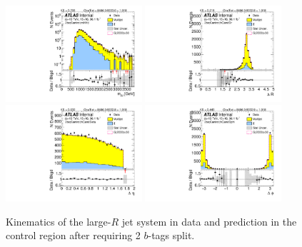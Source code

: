 \begin{figure}[htbp!]
\begin{center}
\includegraphics[width=0.45\textwidth,angle=-90]{figures/boosted/Control/b77_TwoTag_split_Control_mHH_l_1.pdf}
\includegraphics[width=0.45\textwidth,angle=-90]{figures/boosted/Control/b77_TwoTag_split_Control_hCandDr.pdf}\\
\includegraphics[width=0.45\textwidth,angle=-90]{figures/boosted/Control/b77_TwoTag_split_Control_hCandDeta.pdf}
\includegraphics[width=0.45\textwidth,angle=-90]{figures/boosted/Control/b77_TwoTag_split_Control_hCandDphi.pdf}
  \caption{Kinematics of the large-$R$ jet system in data and prediction in the control region after requiring 2 $b$-tags split.  }
  \label{fig:boosted-2bs-control-ak10-system}
\end{center}
\end{figure}

